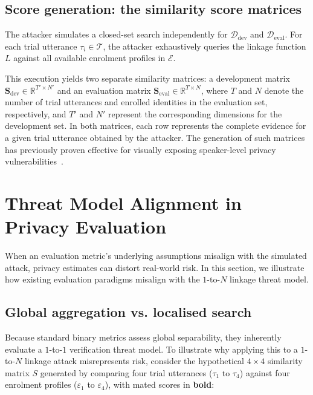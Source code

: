 



\subsection{Score generation: the similarity score matrices}
\label{subsec:score_generation}

The attacker simulates a closed-set search independently for $\mathcal{D}_{\text{dev}}$ and $\mathcal{D}_{\text{eval}}$. For each trial utterance $\tau_i \in \mathcal{T}$, the attacker exhaustively queries the linkage function $L$ against all available enrolment profiles in $\mathcal{E}$.

This execution yields two separate similarity matrices: a development matrix $\mathbf{S}_{\text{dev}} \in \mathbb{R}^{T' \times N'}$ and an evaluation matrix $\mathbf{S}_{\text{eval}} \in \mathbb{R}^{T \times N}$, where $T$ and $N$ denote the number of trial utterances and enrolled identities in the evaluation set, respectively, and $T'$ and $N'$ represent the corresponding dimensions for the development set. In both matrices, each row represents the complete evidence for a given trial utterance obtained by the attacker. The generation of such matrices has previously proven effective for visually exposing speaker-level privacy vulnerabilities~\cite{noe2020speech}.


\section{Threat Model Alignment in Privacy Evaluation}
\label{sec:mismatch}

When an evaluation metric's underlying assumptions misalign with the simulated attack, privacy estimates can distort real-world risk. In this section, we illustrate how existing evaluation paradigms misalign with the $1$-to-$N$ linkage threat model.



\subsection{Global aggregation vs. localised search}

Because standard binary metrics assess global separability, they inherently evaluate a $1$-to-$1$ verification threat model. To illustrate why applying this to a $1$-to-$N$ linkage attack misrepresents risk, consider the hypothetical $4 \times 4$ similarity matrix $S$ generated by comparing four trial utterances ($\tau_1$ to $\tau_4$) against four enrolment profiles ($\varepsilon_1$ to $\varepsilon_4$), with mated scores in \textbf{bold}: 

